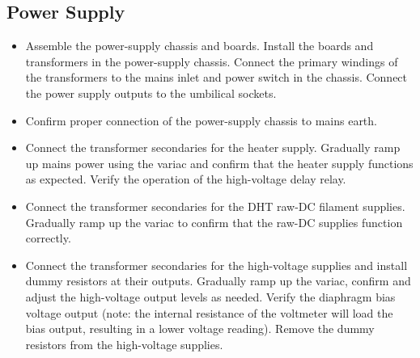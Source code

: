 \subsection{Power Supply}
\begin{itemize}
\item Assemble the power-supply chassis and boards. Install the boards and transformers in the power-supply chassis. Connect the primary windings of the transformers to the mains inlet and power switch in the chassis. Connect the power supply outputs to the umbilical sockets.
\item Confirm proper connection of the power-supply chassis to mains earth.
\item Connect the transformer secondaries for the heater supply. Gradually ramp up mains power using the variac and confirm that the heater supply functions as expected. Verify the operation of the high-voltage delay relay.
\item Connect the transformer secondaries for the DHT raw-DC filament supplies. Gradually ramp up the variac to confirm that the raw-DC supplies function correctly.
\item Connect the transformer secondaries for the high-voltage supplies and install dummy resistors at their outputs. Gradually ramp up the variac, confirm and adjust the high-voltage output levels as needed. Verify the diaphragm bias voltage output (note: the internal resistance of the voltmeter will load the bias output, resulting in a lower voltage reading). Remove the dummy resistors from the high-voltage supplies.
\end{itemize}

